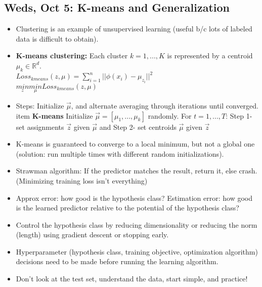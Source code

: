 \documentclass[10pt, oneside]{article}
\begin{document}
\subsection{Weds, Oct 5: K-means and Generalization}

\begin{itemize}

\item Clustering is an example of unsupervised learning (useful b/c lots of labeled data is difficult to obtain).

\item \textbf{K-means clustering:} Each cluster $k = 1,...,K$ is represented by a centroid $\mu_k \in \mathbb{R}^d$.\\
$Loss_{kmeans}(z, \mu) = \sum_{i=1}^n||\phi(x_i)-\mu_{z_i}||^2$\\
$\underset{z}{min}\underset{\mu}{min}Loss_{kmeans}(z, \mu)$

\item Steps: Initialize $\vec{\mu}$, and alternate averaging through iterations until converged.
item \textbf{K-means} Initialize $\vec{\mu} = [\mu_1,...,\mu_k]$ randomly. For $t = 1,...,T$: Step 1- set assignments $\vec{z}$ given $\vec{\mu}$ and Step 2- set centroids $\vec{\mu}$ given $\vec{z}$

\item K-means is guaranteed to converge to a local minimum, but not a global one (solution: run multiple times with different random initializations).

\item Strawman algorithm: If the predictor matches the result, return it, else crash. (Minimizing training loss isn't everything)

\item Approx error: how good is the hypothesis class? Estimation error: how good is the learned predictor relative to the potential of the hypothesis class?

\item Control the hypothesis class by reducing dimensionality or reducing the norm (length) using gradient descent or stopping early.

\item Hyperparameter (hypothesis class, training objective, optimization algorithm) decisions need to be made before running the learning algorithm.

\item Don't look at the test set, understand the data, start simple, and practice!
\end{itemize}
\end{document}
